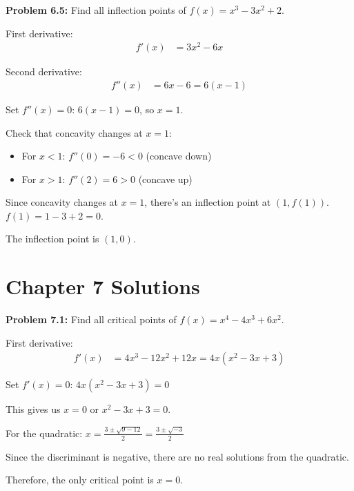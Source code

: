 \documentclass[12pt,a4paper]{book}
\theoremstyle{definition}
\begin{document}
\begin{solution}
\textbf{Problem 6.5:} Find all inflection points of $f(x) = x^3 - 3x^2 + 2$.

First derivative:
\begin{align}
f'(x) &= 3x^2 - 6x
\end{align}

Second derivative:
\begin{align}
f''(x) &= 6x - 6 = 6(x - 1)
\end{align}

Set $f''(x) = 0$: $6(x - 1) = 0$, so $x = 1$.

Check that concavity changes at $x = 1$:
\begin{itemize}
    \item For $x < 1$: $f''(0) = -6 < 0$ (concave down)
    \item For $x > 1$: $f''(2) = 6 > 0$ (concave up)
\end{itemize}

Since concavity changes at $x = 1$, there's an inflection point at $(1, f(1))$.
$f(1) = 1 - 3 + 2 = 0$.

The inflection point is $(1, 0)$.
\end{solution}

\section*{Chapter 7 Solutions}

\begin{solution}
\textbf{Problem 7.1:} Find all critical points of $f(x) = x^4 - 4x^3 + 6x^2$.

First derivative:
\begin{align}
f'(x) &= 4x^3 - 12x^2 + 12x = 4x(x^2 - 3x + 3)
\end{align}

Set $f'(x) = 0$: $4x(x^2 - 3x + 3) = 0$

This gives us $x = 0$ or $x^2 - 3x + 3 = 0$.

For the quadratic: $x = \frac{3 \pm \sqrt{9 - 12}}{2} = \frac{3 \pm \sqrt{-3}}{2}$

Since the discriminant is negative, there are no real solutions from the quadratic.

Therefore, the only critical point is $x = 0$.
\end{solution}
\end{document}
